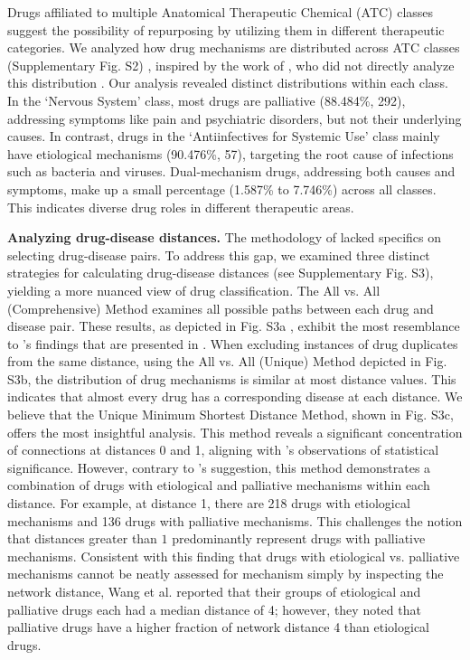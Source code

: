 \documentclass[journal,twoside,web]{ieeecolor}
\begin{document}
Drugs affiliated to multiple Anatomical Therapeutic Chemical (ATC) classes suggest the possibility of repurposing by utilizing them in different therapeutic categories.
We analyzed how drug mechanisms are distributed across ATC classes (Supplementary Fig. S2)%
, inspired by the work of \cite{yildirim2007drug}, who did not directly analyze this distribution \cite[Fig. 2]{yildirim2007drug}.
Our analysis revealed distinct distributions within each class.
In the `Nervous System' class, most drugs are palliative (88.484\%, 292), addressing symptoms like pain and psychiatric disorders, but not their underlying causes.
In contrast, drugs in the `Antiinfectives for Systemic Use' class mainly have etiological mechanisms (90.476\%, 57), targeting the root cause of infections such as bacteria and viruses.
Dual-mechanism drugs, addressing both causes and symptoms, make up a small percentage (1.587\% to 7.746\%) across all classes.
This indicates diverse drug roles in different therapeutic areas.

\textbf{Analyzing drug-disease distances.}
The methodology of \cite{yildirim2007drug} lacked specifics on selecting drug-disease pairs.
To address this gap, we examined three distinct strategies for calculating drug-disease distances (see Supplementary Fig. S3), yielding a more nuanced view of drug classification.
The All vs. All (Comprehensive) Method examines all possible paths between each drug and disease pair.
These results, as depicted in Fig. S3a%
, exhibit the most resemblance to \cite{yildirim2007drug}'s findings that are presented in \cite[Fig. 6a]{yildirim2007drug}.
When excluding instances of drug duplicates from the same distance, using the All vs. All (Unique) Method depicted in Fig. S3b, %
the distribution of drug mechanisms is similar at most distance values.
This indicates that almost every drug has a corresponding disease at each distance.
We believe that the Unique Minimum Shortest Distance Method, shown in Fig. S3c, %
offers the most insightful analysis.
This method reveals a significant concentration of connections at distances 0 and 1, aligning with \cite{yildirim2007drug}'s observations of statistical significance.
However, contrary to \cite{yildirim2007drug}'s suggestion, this method demonstrates a combination of drugs with etiological and palliative mechanisms within each distance.
For example, at distance 1, there are 218 drugs with etiological mechanisms and 136 drugs with palliative mechanisms.
This challenges the notion that distances greater than $1$ predominantly represent drugs with palliative mechanisms. Consistent with this finding that drugs with etiological vs. palliative mechanisms cannot be neatly assessed for mechanism simply by inspecting the network distance, Wang et al. \cite{wang2012relationship} reported that their groups of etiological and palliative drugs each had a median distance of 4; however, they noted that palliative drugs have a higher fraction of network distance 4 than etiological drugs.
\end{document}
